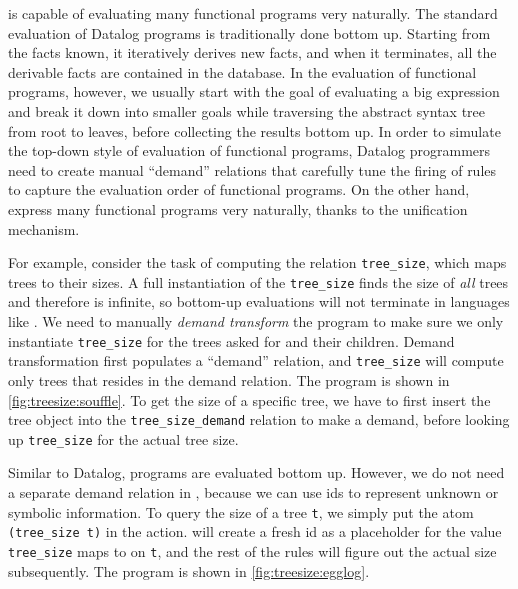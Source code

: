 
 \Egglog is capable of evaluating many functional programs very naturally.
 The standard evaluation of Datalog programs is traditionally done bottom up.
 Starting from the facts known,
  it iteratively derives new facts,
  and when it terminates,
  all the derivable facts
  are contained in the database.
 In the evaluation of functional programs,
  however,
  we usually start with the goal of evaluating a big expression and
  break it down into smaller goals while
  traversing the abstract syntax tree from root to leaves,
  before collecting the results bottom up.
 In order to simulate the top-down style of evaluation
  of functional programs,
  Datalog programmers need to create manual ``demand'' relations
  that carefully tune the firing of rules
  to capture the evaluation order of functional programs.
 On the other hand,
  \egglog express many functional programs very naturally,
  thanks to the unification mechanism.

 For example, consider the task of computing the relation \verb|tree_size|,
  which maps trees to their sizes.
 A full instantiation of the \verb|tree_size| finds the size of \emph{all} trees
  and therefore is infinite,
  so bottom-up evaluations will not terminate
  in languages like \souffle.
 We need to manually \textit{demand transform} the program
  to make sure we only instantiate \verb|tree_size|
  for the trees asked for and their children.
 Demand transformation first populates a ``demand'' relation,
  and \verb|tree_size| will compute only trees that resides in the demand relation.
 The program is shown in \autoref{fig:treesize:souffle}.
 To get the size of a specific tree,
  we have to first insert the tree object into the \verb|tree_size_demand|
  relation to make a demand, before looking up \verb|tree_size| for
  the actual tree size.

 Similar to Datalog, \egglog programs are evaluated bottom up.
 However, we do not need a separate demand relation in \egglog,
  because we can use ids
  to represent unknown or symbolic information.
 To query the size of a tree \verb|t|,
  we simply put the atom \verb|(tree_size t)| in the action.
 \Egglog will create a fresh id as a placeholder for the value
  \verb|tree_size| maps to on \verb|t|,
  and the rest of the rules will
  figure out the actual size subsequently.
 The \egglog program is shown in \autoref{fig:treesize:egglog}.

